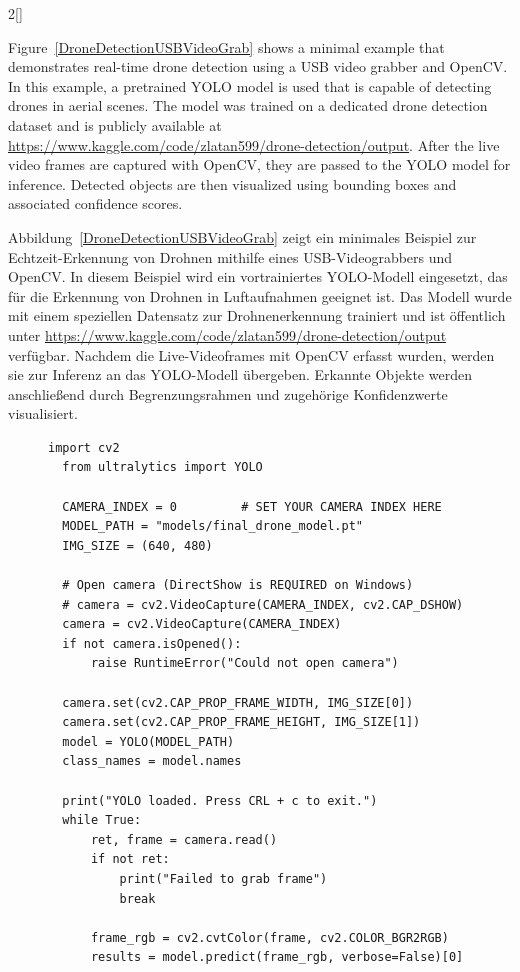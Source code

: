 \begin{paracol}{2}[]
\coleng

Figure~\ref{DroneDetectionUSBVideoGrab} shows a minimal example that demonstrates real-time drone detection using a USB video grabber and OpenCV. In this example, a pretrained YOLO model is used that is capable of detecting drones in aerial scenes. The model was trained on a dedicated drone detection dataset and is publicly available at \url{https://www.kaggle.com/code/zlatan599/drone-detection/output}. After the live video frames are captured with OpenCV, they are passed to the YOLO model for inference. Detected objects are then visualized using bounding boxes and associated confidence scores.

\colger

Abbildung~\ref{DroneDetectionUSBVideoGrab} zeigt ein minimales Beispiel zur Echtzeit-Erkennung von Drohnen mithilfe eines USB-Videograbbers und OpenCV. In diesem Beispiel wird ein vortrainiertes YOLO-Modell eingesetzt, das für die Erkennung von Drohnen in Luftaufnahmen geeignet ist. Das Modell wurde mit einem speziellen Datensatz zur Drohnenerkennung trainiert und ist öffentlich unter \url{https://www.kaggle.com/code/zlatan599/drone-detection/output} verfügbar. Nachdem die Live-Videoframes mit OpenCV erfasst wurden, werden sie zur Inferenz an das YOLO-Modell übergeben. Erkannte Objekte werden anschließend durch Begrenzungsrahmen und zugehörige Konfidenzwerte visualisiert.

\colende

\begin{figure}
\begin{lstlisting}[style=shell]
  import cv2
  from ultralytics import YOLO

  CAMERA_INDEX = 0         # SET YOUR CAMERA INDEX HERE
  MODEL_PATH = "models/final_drone_model.pt"
  IMG_SIZE = (640, 480)

  # Open camera (DirectShow is REQUIRED on Windows)
  # camera = cv2.VideoCapture(CAMERA_INDEX, cv2.CAP_DSHOW)
  camera = cv2.VideoCapture(CAMERA_INDEX)
  if not camera.isOpened():
      raise RuntimeError("Could not open camera")

  camera.set(cv2.CAP_PROP_FRAME_WIDTH, IMG_SIZE[0])
  camera.set(cv2.CAP_PROP_FRAME_HEIGHT, IMG_SIZE[1])
  model = YOLO(MODEL_PATH)
  class_names = model.names

  print("YOLO loaded. Press CRL + c to exit.")
  while True:
      ret, frame = camera.read()
      if not ret:
          print("Failed to grab frame")
          break

      frame_rgb = cv2.cvtColor(frame, cv2.COLOR_BGR2RGB)
      results = model.predict(frame_rgb, verbose=False)[0]


\end{lstlisting}
\end{figure}
\end{paracol}
